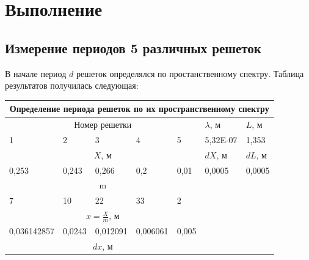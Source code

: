 \documentclass[a4paper,12pt]{article}
\begin{document}
\section{Выполнение} 
\subsection{Измерение периодов 5 различных решеток}
В начале период $d$ решеток определялся по простанственному спектру. Таблица результатов получилась следующая: 

\begin{table}[h!]
	\begin{tabular}{|c|l|l|l|l|ll}
		\hline
		\multicolumn{7}{|c|}{Определение   периода решеток по их пространственному спектру}                                                             \\ \hline
		\multicolumn{5}{|c|}{Номер решетки}                                              & \multicolumn{1}{l|}{$\lambda$, м} & \multicolumn{1}{l|}{$L$, м}   \\ \hline
		\multicolumn{1}{|l|}{1}           & 2        & 3        & 4        & 5           & \multicolumn{1}{l|}{5,32E-07}  & \multicolumn{1}{l|}{1,353}  \\ \hline
		\multicolumn{5}{|c|}{$X$, м}                                                       & \multicolumn{1}{l|}{$dX$, м}     & \multicolumn{1}{l|}{$dL$, м}  \\ \hline
		\multicolumn{1}{|l|}{0,253}       & 0,243    & 0,266    & 0,2      & 0,01        & \multicolumn{1}{l|}{0,0005}    & \multicolumn{1}{l|}{0,0005} \\ \hline
		\multicolumn{5}{|c|}{m}                                                          &                                &                             \\ \cline{1-5}
		\multicolumn{1}{|l|}{7}           & 10       & 22       & 33       & 2           &                                &                             \\ \cline{1-5}
		\multicolumn{5}{|c|}{$x = \frac{X}{m}$, м}                                                 &                                &                             \\ \cline{1-5}
		\multicolumn{1}{|l|}{0,036142857} & 0,0243   & 0,012091 & 0,006061 & 0,005       &                                &                             \\ \cline{1-5}
		\multicolumn{5}{|c|}{$dx$, м}                                                      &                                &                             \\ \cline{1-5}

\end{tabular}
\end{table}
\end{document}
